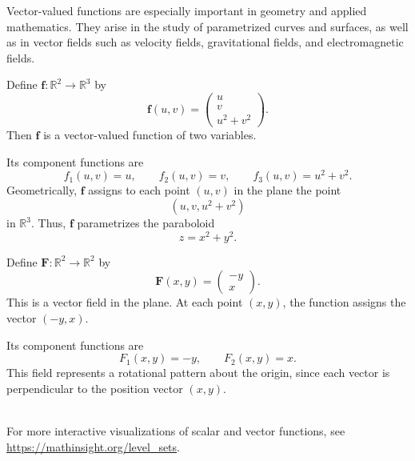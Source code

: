 Vector-valued functions are especially important in geometry and applied mathematics. They arise in the study of parametrized curves and surfaces, as well as in vector fields such as velocity fields, gravitational fields, and electromagnetic fields.

\begin{example}
Define $\mathbf{f}:\mathbb{R}^2\to\mathbb{R}^3$ by
\[
\mathbf{f}(u,v)=
\begin{pmatrix}
u\\
v\\
u^2+v^2
\end{pmatrix}.
\]
Then $\mathbf{f}$ is a vector-valued function of two variables.

Its component functions are
\[
f_1(u,v)=u,\qquad f_2(u,v)=v,\qquad f_3(u,v)=u^2+v^2.
\]
Geometrically, $\mathbf{f}$ assigns to each point $(u,v)$ in the plane the point
\[
(u,v,u^2+v^2)
\]
in $\mathbb{R}^3$. Thus, $\mathbf{f}$ parametrizes the paraboloid
\[
z=x^2+y^2.
\]
\end{example}

\begin{example}
Define $\mathbf{F}:\mathbb{R}^2\to\mathbb{R}^2$ by
\[
\mathbf{F}(x,y)=
\begin{pmatrix}
-y\\
x
\end{pmatrix}.
\]
This is a vector field in the plane. At each point $(x,y)$, the function assigns the vector $(-y,x)$.

Its component functions are
\[
F_1(x,y)=-y,\qquad F_2(x,y)=x.
\]
This field represents a rotational pattern about the origin, since each vector is perpendicular to the position vector $(x,y)$.
\end{example}
~\\
For more interactive visualizations of scalar and vector functions, see \url{https://mathinsight.org/level_sets}.

